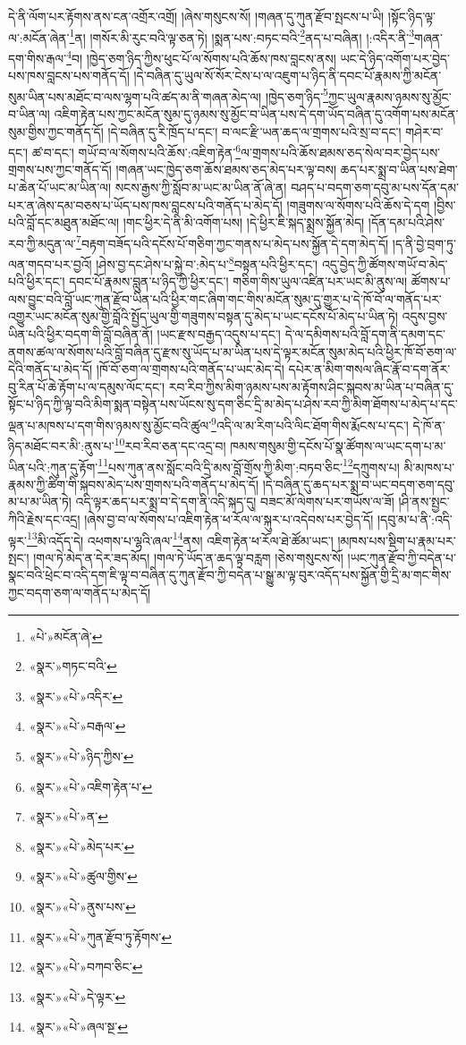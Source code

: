 དེ་ནི་ལོག་པར་རྟོགས་ནས་ངན་འགྲོར་འགྲོ། །ཞེས་གསུངས་སོ། །གཞན་དུ་ཀུན་རྫོབ་སྤངས་པ་ཡི། །སྟོང་ཉིད་ལྟ་ལ་:མངོན་ཞེན་\footnote{«པེ་»མངོན་ཞེ་}ན། །གསོར་མི་རུང་བའི་ལྟ་ཅན་ཏེ། །སྨན་པས་:བཏང་བའི་\footnote{«སྣར་»གཏང་བའི་}ནད་པ་བཞིན། །:འདིར་ནི་\footnote{«སྣར་»«པེ་»འདིར་}གཞན་དག་གིས་རྒལ་\footnote{«སྣར་»«པེ་»བརྒལ་}བ། །ཁྱེད་ཅག་ཉིད་ཀྱིས་ཕུང་པོ་ལ་སོགས་པའི་ཆོས་ཁས་བླངས་ནས། ཡང་དེ་ཉིད་འགོག་པར་བྱེད་པས་ཁས་བླངས་པས་གནོད་དོ། །དེ་བཞིན་དུ་ཡུལ་སོ་སོར་ངེས་པ་ལ་འཇུག་པ་ཉིད་ནི་དབང་པོ་རྣམས་ཀྱི་མངོན་སུམ་ཡིན་པས་མཐོང་བ་ལས་ལྷག་པའི་ཚད་མ་ནི་གཞན་མེད་ལ། །ཁྱེད་ཅག་ཉིད་\footnote{«སྣར་»«པེ་»ཉིད་ཀྱིས་}ཀྱང་ཡུལ་རྣམས་ཉམས་སུ་མྱོང་བ་ཡིན་ལ། འཇིག་རྟེན་པས་ཀྱང་མངོན་སུམ་དུ་ཉམས་སུ་མྱོང་བ་ཡིན་པས་དེ་དག་ཡོད་བཞིན་དུ་འགོག་པས་མངོན་སུམ་གྱིས་ཀྱང་གནོད་དོ། །དེ་བཞིན་དུ་རི་ཁྲོད་པ་དང་། བ་ལང་རྫི་ཡན་ཆད་ལ་གྲགས་པའི་སྲ་བ་དང་། གཤེར་བ་དང་། ཚ་བ་དང་། གཡོ་བ་ལ་སོགས་པའི་ཆོས་:འཇིག་རྟེན་\footnote{«སྣར་»«པེ་»འཇིག་རྟེན་པ་}ལ་གྲགས་པའི་ཆོས་ཐམས་ཅད་སེལ་བར་བྱེད་པས་གྲགས་པས་ཀྱང་གནོད་དོ། །གཞན་ཡང་ཁྱེད་ཅག་ཆོས་ཐམས་ཅད་མེད་པར་ལྟ་བས། ཆད་པར་སྨྲ་བ་ཡིན་པས་ཐེག་པ་ཆེན་པོ་ཡང་མ་ཡིན་ལ། སངས་རྒྱས་ཀྱི་སློབ་མ་ཡང་མ་ཡིན་ནོ་ཞེ་ན། བཤད་པ་བདག་ཅག་དབུ་མ་པས་དོན་དམ་པར་ན་ཞེས་དམ་བཅས་པ་ཡོད་པས་ཁས་བླངས་པའི་གནོད་པ་མེད་དོ། །གཟུགས་ལ་སོགས་པའི་ཆོས་དེ་དག །བྱིས་པའི་བློ་དང་མཐུན་མཐོང་ལ། །གང་ཕྱིར་དེ་ནི་མི་འགོག་པས། །དེ་ཕྱིར་ཇི་སྐད་སྨྲས་སྐྱོན་མེད། །དོན་དམ་པའི་ཤེས་རབ་ཀྱི་མདུན་ལ་\footnote{«སྣར་»«པེ་»ན་}བརྟག་བཟོད་པའི་དངོས་པོ་གཅིག་ཀྱང་གནས་པ་མེད་པས་སྐྱོན་དེ་དག་མེད་དོ། །ད་ནི་བྱེ་བྲག་ཏུ་ལན་གདབ་པར་བྱའོ། །ཤེས་བྱ་དང་ཤེས་པ་སྐྱེ་བ་:མེད་པ་\footnote{«སྣར་»«པེ་»མེད་པར་}བསྟན་པའི་ཕྱིར་དང་། འདུ་བྱེད་ཀྱི་ཚོགས་གཡོ་བ་མེད་པའི་ཕྱིར་དང་། དབང་པོ་རྣམས་བླུན་པ་ཉིད་ཀྱི་ཕྱིར་དང་། གཅིག་གིས་ཡུལ་འཛིན་པར་ཡང་མི་ནུས་ལ། ཚོགས་པ་ལས་བྱུང་བའི་བློ་ཡང་ཀུན་རྫོབ་ཡིན་པའི་ཕྱིར་གང་ཞིག་གང་གིས་མངོན་སུམ་དུ་གྱུར་པ་དེ་ཁོ་བོ་ལ་གནོད་པར་འགྱུར་ཡང་མངོན་སུམ་གྱི་བློའི་སྤྱོད་ཡུལ་གྱི་གཟུགས་བསྟན་དུ་མེད་པ་ཡང་དངོས་པོ་མེད་པ་ཡིན་ཏེ། འདུས་བྱས་ཡིན་པའི་ཕྱིར་བདག་གི་བློ་བཞིན་ནོ། །ཡང་རྫས་བརྒྱད་འདུས་པ་དང་། དེ་ལ་དམིགས་པའི་བློ་དག་ནི་དམག་དང་ནགས་ཚལ་ལ་སོགས་པའི་བློ་བཞིན་དུ་རྫས་སུ་ཡོད་པ་མ་ཡིན་པས་དེ་ལྟར་མངོན་སུམ་མེད་པའི་ཕྱིར་ཁོ་བོ་ཅག་ལ་དེའི་གནོད་པ་མེད་དོ། །ཁོ་བོ་ཅག་ལ་གྲགས་པའི་གནོད་པ་ཡང་མེད་དེ། དཔེར་ན་མིག་གསལ་ཞིང་རྣོ་བ་དག་ནོར་བུ་རིན་པོ་ཆེ་རྟོག་པ་ལ་དམུས་ལོང་དང་། རབ་རིབ་ཀྱིས་མིག་ཉམས་པས་མ་རྟོགས་ཤིང་སྐབས་མ་ཡིན་པ་བཞིན་དུ་སྟོང་པ་ཉིད་ཀྱི་ལྟ་བའི་མིག་སྨན་བསྟེན་པས་ཡོངས་སུ་དག་ཅིང་དྲི་མ་མེད་པ་ཤེས་རབ་ཀྱི་མིག་ཐོགས་པ་མེད་པ་དང་ལྡན་པ་མཁས་པ་དག་གིས་ཉམས་སུ་མྱོང་བའི་ཚུལ་\footnote{«སྣར་»«པེ་»ཚུལ་གྱིས་}འདི་ལ་མ་རིག་པའི་ལིང་ཐོག་གིས་རྨོངས་པ་དང་། དེ་ཁོ་ན་ཉིད་མཐོང་བར་མི་:ནུས་པ་\footnote{«སྣར་»«པེ་»ནུས་པས་}རབ་རིབ་ཅན་དང་འདྲ་བ། ཁམས་གསུམ་གྱི་དངོས་པོ་སྣ་ཚོགས་ལ་ཡང་དག་པ་མ་ཡིན་པའི་:ཀུན་དུ་རྟོག་\footnote{«སྣར་»«པེ་»ཀུན་རྫོབ་ཏུ་རྟོགས་}པས་ཀུན་ནས་སློང་བའི་དྲི་མས་བློ་གྲོས་ཀྱི་མིག་:བཏབ་ཅིང་\footnote{«སྣར་»«པེ་»བཀབ་ཅིང་}དཀྲུགས་པ། མི་མཁས་པ་རྣམས་ཀྱི་ཚིག་གི་སྐབས་མེད་པས་གྲགས་པའི་གནོད་པ་མེད་དོ། །དེ་བཞིན་དུ་ཆད་པར་སྨྲ་བ་ཡང་བདག་ཅག་དབུ་མ་པ་མ་ཡིན་ཏེ། འདི་ལྟར་ཆད་པར་སྨྲ་བ་དེ་དག་ནི་འདི་སྐད་དུ། བཟང་མོ་ལེགས་པར་གཡོས་ལ་ཟོ། །ཤི་ནས་སྤྱང་ཀིའི་རྗེས་དང་འདྲ། །ཞེས་བྱ་བ་ལ་སོགས་པ་འཇིག་རྟེན་ཕ་རོལ་ལ་སྐུར་པ་འདེབས་པར་བྱེད་དོ། །དབུ་མ་པ་ནི་:འདི་ལྟར་\footnote{«སྣར་»«པེ་»དེ་ལྟར་}མི་འདོད་དེ། འཕགས་པ་ལྷའི་ཞལ་\footnote{«སྣར་»«པེ་»ཞལ་སྔ་}ནས། འཇིག་རྟེན་ཕ་རོལ་ཐེ་ཚོམ་ཡང་། །མཁས་པས་སྡིག་པ་རྣམ་པར་སྤང་། །གལ་ཏེ་མེད་ན་དེར་ཟད་མོད། །གལ་ཏེ་ཡོད་ན་ཆད་ལྟ་བརླག །ཅེས་གསུངས་སོ། །ཡང་ཀུན་རྫོབ་ཀྱི་བདེན་པ་སྣང་བའི་ཕྲེང་བ་འདི་དག་ཇི་ལྟ་བ་བཞིན་དུ་ཀུན་རྫོབ་ཀྱི་བདེན་པ་སྒྱུ་མ་ལྟ་བུར་འདོད་པས་སྐྱོན་གྱི་དྲི་མ་གང་གིས་ཀྱང་བདག་ཅག་ལ་གནོད་པ་མེད་དོ། 